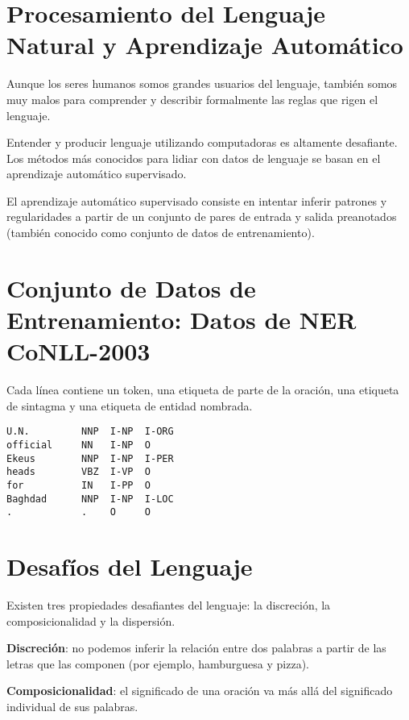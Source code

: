 \documentclass{book}
\begin{document}
\section{Procesamiento del Lenguaje Natural y Aprendizaje Automático}

Aunque los seres humanos somos grandes usuarios del lenguaje, también somos muy malos para comprender y describir formalmente las reglas que rigen el lenguaje.

Entender y producir lenguaje utilizando computadoras es altamente desafiante. Los métodos más conocidos para lidiar con datos de lenguaje se basan en el aprendizaje automático supervisado.

El aprendizaje automático supervisado consiste en intentar inferir patrones y regularidades a partir de un conjunto de pares de entrada y salida preanotados (también conocido como conjunto de datos de entrenamiento).

\section{Conjunto de Datos de Entrenamiento: Datos de NER CoNLL-2003}

Cada línea contiene un token, una etiqueta de parte de la oración, una etiqueta de sintagma y una etiqueta de entidad nombrada.
\begin{center}
\begin{verbatim}
U.N.         NNP  I-NP  I-ORG
official     NN   I-NP  O
Ekeus        NNP  I-NP  I-PER
heads        VBZ  I-VP  O
for          IN   I-PP  O
Baghdad      NNP  I-NP  I-LOC
.            .    O     O
\end{verbatim}
\end{center}


\section{Desafíos del Lenguaje}

Existen tres propiedades desafiantes del lenguaje: la discreción, la composicionalidad y la dispersión.

\textbf{Discreción}: no podemos inferir la relación entre dos palabras a partir de las letras que las componen (por ejemplo, hamburguesa y pizza).

\textbf{Composicionalidad}: el significado de una oración va más allá del significado individual de sus palabras.
\end{document}
